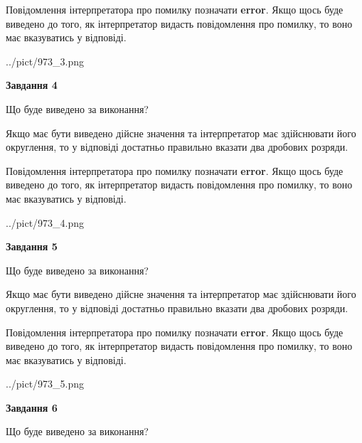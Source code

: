\documentclass[12pt, ukrainian]{article}
\begin{document}
{\begin {Large}
Повідомлення інтерпретатора про помилку позначати \textbf{error}.
Якщо щось буде виведено до того, як інтерпретатор видасть повідомлення про помилку, 
то воно має вказуватись у відповіді. \par

\begin{center}
	{../pict/973_3.png}
\end{center}
\newpage

{\begin {center}\textbf{Завдання 4}\end {center}}\par
Що буде виведено за виконання? \par

Якщо має бути виведено дійсне значення та інтерпретатор має здійснювати його округлення, 
то у відповіді достатньо правильно вказати два дробових розряди.

Повідомлення інтерпретатора про помилку позначати \textbf{error}.
Якщо щось буде виведено до того, як інтерпретатор видасть повідомлення про помилку, 
то воно має вказуватись у відповіді. \par

\begin{center}
	{../pict/973_4.png}
\end{center}
\newpage

{\begin {center}\textbf{Завдання 5}\end {center}}\par
Що буде виведено за виконання? \par

Якщо має бути виведено дійсне значення та інтерпретатор має здійснювати його округлення, 
то у відповіді достатньо правильно вказати два дробових розряди.

Повідомлення інтерпретатора про помилку позначати \textbf{error}.
Якщо щось буде виведено до того, як інтерпретатор видасть повідомлення про помилку, 
то воно має вказуватись у відповіді. \par

\begin{center}
	{../pict/973_5.png}
\end{center}
\newpage

{\begin {center}\textbf{Завдання 6}\end {center}}\par
Що буде виведено за виконання? \par


\end{Large}}
\end{document}
